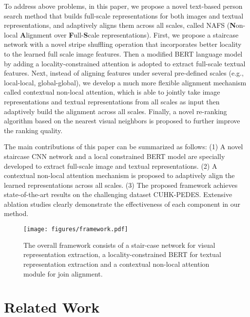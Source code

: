 \documentclass[final]{cvpr}
\begin{document}
To address above problems, in this paper, we propose a novel text-based person search method that builds full-scale representations for both images and textual representations, and adaptively aligns them across all scales, called NAFS (\textbf{N}on-local \textbf{A}lignment over  \textbf{F}ull-\textbf{S}cale representations). 
First, we propose a staircase network with a novel stripe shuffling operation that incorporates better locality to the learned full scale image features. 
Then a modified BERT language model by adding a locality-constrained attention is adopted to extract full-scale textual features.
Next, instead of aligning features under several pre-defined scales (e.g., local-local, global-global), we develop a much more flexible alignment mechanism called contextual non-local attention, which is able to jointly take image representations and textual representations from all scales as input then adaptively build the alignment across all scales. 
Finally, a novel re-ranking algorithm based on the nearest visual neighbors is proposed to further improve the ranking quality. 

The main contributions of this paper can be summarized as follows: (1) A novel staircase CNN network and a local constrained BERT model are specially developed to extract full-scale image and textual representations. (2) A contextual non-local attention mechanism is proposed to adaptively align the learned representations across all scales. (3) The proposed framework achieves state-of-the-art results on the challenging dataset CUHK-PEDES\cite{li2017person}. Extensive ablation studies clearly demonstrate the effectiveness of each component in our method. 


\begin{figure*}
    \centering
    \texttt{[image: figures/framework.pdf]}
    \caption{The overall framework consists of a stair-case network for visual representation extraction, a locality-constrained BERT for textual representation extraction and a contextual non-local attention module for join alignment. 
    }
    \label{fig_framework}
\end{figure*}

\section{Related Work}
\end{document}
